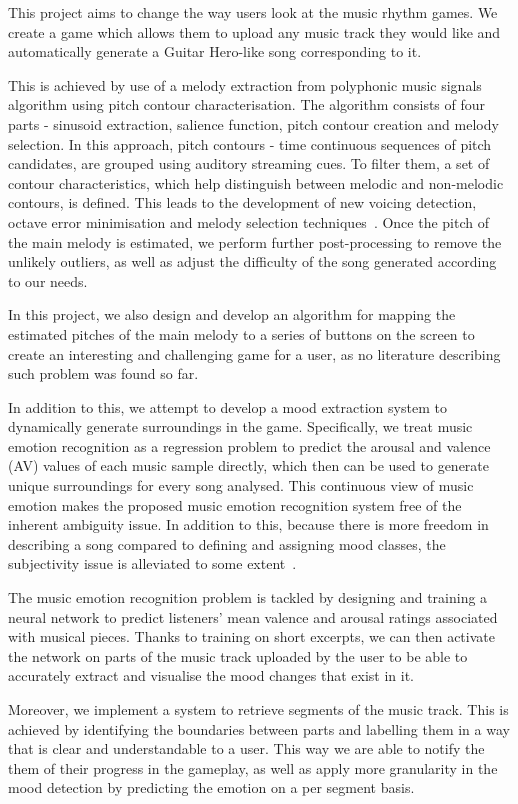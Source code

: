 This project aims to change the way users look at the music rhythm games. We create a game which allows them to upload any music track they would like and automatically generate a Guitar Hero-like song corresponding to it. 

This is achieved by use of a melody extraction from polyphonic music signals algorithm using pitch contour characterisation. The algorithm consists of four parts - sinusoid extraction, salience function, pitch contour creation and melody selection. In this approach, pitch contours - time continuous sequences of pitch candidates, are grouped using auditory streaming cues. To filter them, a set of contour characteristics, which help distinguish between melodic and non-melodic contours, is defined. This leads to the development of new voicing detection, octave error minimisation and melody selection techniques~\cite{salamon}. Once the pitch of the main melody is estimated, we perform further post-processing to remove the unlikely outliers, as well as adjust the difficulty of the song generated according to our needs.

In this project, we also design and develop an algorithm for mapping the estimated pitches of the main melody to a series of buttons on the screen to create an interesting and challenging game for a user, as no literature describing such problem was found so far.

In addition to this, we attempt to develop a mood extraction system to dynamically generate surroundings in the game. Specifically, we treat music emotion recognition as a regression problem to predict the arousal and valence (AV) values of each music sample directly, which then can be used to generate unique surroundings for every song analysed. This continuous view of music emotion makes the proposed music emotion recognition system free of the inherent ambiguity issue. In addition to this, because there is more freedom in describing a song compared to defining and assigning mood classes, the subjectivity issue is alleviated to some extent~\cite{mood}.

The music emotion recognition problem is tackled by designing and training a neural network to predict listeners’ mean valence and arousal ratings associated with musical pieces. Thanks to training on short excerpts, we can then activate the network on parts of the music track uploaded by the user to be able to accurately extract and visualise the mood changes that exist in it.

Moreover, we implement a system to retrieve segments of the music track. This is achieved by identifying the boundaries between parts and labelling them in a way that is clear and understandable to a user. This way we are able to notify the them of their progress in the gameplay, as well as apply more granularity in the mood detection by predicting the emotion on a per segment basis.


